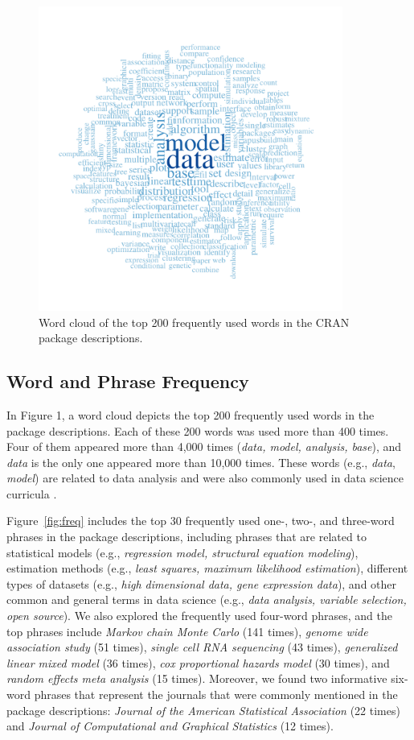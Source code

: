 \begin{figure}
\centering
    \includegraphics[width=10cm]{fig/wd_plot2.pdf}
    \caption{Word cloud of the top 200 frequently used words in the CRAN package descriptions.}
    \label{fig:wd_plot}
\end{figure}
	

\subsection{Word and Phrase Frequency}

In Figure 1, a word cloud depicts the top 200 frequently used words in the package descriptions. Each of these 200 words was used more than 400 times. Four of them appeared more than 4,000 times ({\it data, model, analysis, base}), and {\it data} is the only one appeared more than 10,000 times. These words (e.g., {\it data}, {\it model}) are related to data analysis and were also commonly used in data science curricula \citep{zhang2021data}. 



Figure~\ref{fig:freq} includes the top 30 frequently used one-, two-, and three-word phrases in the package descriptions, including phrases that are related to statistical models (e.g., {\it regression model, structural equation modeling}), estimation methods (e.g., {\it least squares, maximum likelihood estimation}), different types of datasets (e.g., {\it high dimensional data, gene expression data}), and other common and general terms in data science (e.g., {\it data analysis, variable selection, open source}). We also explored the frequently used four-word phrases, and the top phrases include {\it Markov chain Monte Carlo} (141 times), {\it genome wide association study} (51 times), {\it single cell RNA sequencing} (43 times), {\it generalized linear mixed model} (36 times), {\it cox proportional hazards model} (30 times), and {\it random effects meta analysis} (15 times). Moreover, we found two informative six-word phrases that represent the journals that were commonly mentioned in the package descriptions: {\it Journal of the American Statistical Association} (22 times) and {\it Journal of Computational and Graphical Statistics} (12 times).




